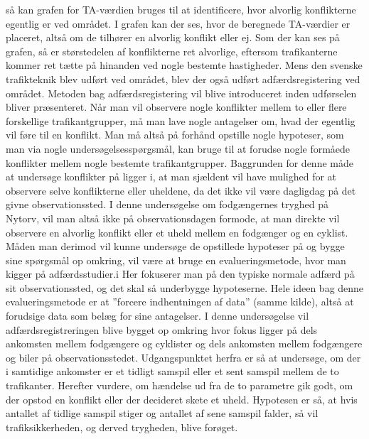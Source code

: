 så kan grafen for TA-værdien bruges til at identificere, hvor alvorlig konflikterne egentlig er ved området. I grafen kan der ses, hvor de beregnede TA-værdier er placeret, altså om de tilhører en alvorlig konflikt eller ej.
Som der kan ses på grafen, så er størstedelen af konflikterne ret alvorlige, eftersom trafikanterne kommer ret tætte på hinanden ved nogle bestemte hastigheder.
Mens den svenske trafikteknik blev udført ved området, blev der også udført adfærdsregistering ved området. Metoden bag adfærdsregistering vil blive introduceret inden udførselen bliver præsenteret.
Når	man	vil	observere nogle	konflikter mellem to eller flere	forskellige trafikantgrupper,	må man lave	nogle antagelser	om, hvad	 der egentlig vil føre til en konflikt. Man må altså	på	forhånd	opstille nogle hypoteser, som man via nogle undersøgelsesspørgsmål, kan bruge til	at forudse nogle	formåede	konflikter mellem nogle bestemte	trafikantgrupper.	Baggrunden for denne	måde at	undersøge konflikter	på ligger i,	at man sjældent 	vil	have	mulighed	 for at	observere selve konflikterne	eller uheldene, da det ikke	vil	være	 dagligdag på	 det	 givne observationssted.	I denne	undersøgelse om	fodgængernes tryghed på	Nytorv,	vil man altså ikke på observationsdagen formode,	at man direkte vil observere en alvorlig	 konflikt eller	et uheld mellem	en fodgænger og	en cyklist.	Måden man derimod	vil	kunne undersøge	de opstillede hypoteser på og bygge sine	spørgsmål op omkring, vil	være	at bruge en	evalueringsmetode, hvor	man	kigger på adfærdsstudier.i Her fokuserer	man	på den typiske normale adfærd på	sit observationssted, og	det skal så	underbygge	hypoteserne. Hele ideen bag denne evalueringsmetode er at ”forcere indhentningen af data”	(samme	kilde),	altså at forudsige data	som	belæg for sine antagelser.
I denne undersøgelse vil	adfærdsregistreringen blive bygget op omkring	 %
hvor fokus ligger på dels ankomsten mellem fodgængere	 og cyklister og dels ankomsten mellem	fodgængere og biler på observationsstedet. Udgangspunktet herfra er så at	undersøge, om	der i samtidige ankomster er	et tidligt samspil eller	et sent samspil mellem de to trafikanter.
Herefter vurdere, om hændelse ud fra	de to parametre gik godt, om	der	opstod en konflikt	eller der decideret skete et	uheld. Hypotesen er	så,	at hvis	antallet af	tidlige samspil stiger og antallet af sene samspil falder, så vil trafiksikkerheden, og derved trygheden, blive forøget.
